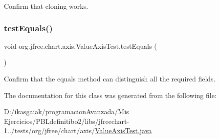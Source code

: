 Confirm that cloning works. \mbox{\label{classorg_1_1jfree_1_1chart_1_1axis_1_1_value_axis_test_a1b6d092a0a5bc4f547cff09dbe79906a}} 
\subsubsection{\texorpdfstring{test\+Equals()}{testEquals()}}
{\footnotesize\ttfamily void org.\+jfree.\+chart.\+axis.\+Value\+Axis\+Test.\+test\+Equals (\begin{DoxyParamCaption}{ }\end{DoxyParamCaption})}

Confirm that the equals method can distinguish all the required fields. 

The documentation for this class was generated from the following file\+:\begin{DoxyCompactItemize}
\item 
D\+:/ikasgaiak/programacion\+Avanzada/\+Mis Ejercicios/\+P\+B\+Ldefinitibo2/libs/jfreechart-\/1../tests/org/jfree/chart/axis/\mbox{\hyperlink{_value_axis_test_8java}{Value\+Axis\+Test.\+java}}\end{DoxyCompactItemize}
